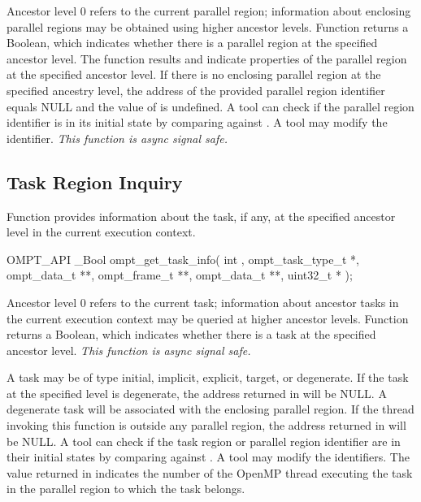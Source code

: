 \documentclass{article}
\begin{document}
\noindent 
Ancestor level 0 refers to the current parallel region; 
information about enclosing parallel regions may be obtained using higher ancestor levels. 
Function  returns a Boolean, which indicates whether there is a parallel region at the specified ancestor level.
The function results  and  indicate properties of the parallel region at the specified ancestor level.
If there is no enclosing parallel region at the specified ancestry level, the address of the provided parallel region identifier  equals NULL and the value of  is undefined.
A tool can check if the parallel region identifier is in its initial state by comparing against .
A tool may modify the identifier.
{\em This function is async signal safe.}
 
\subsection{Task Region Inquiry}
\label{sec:task-region}

Function  provides information about the task, if any, at the specified ancestor level in the current execution context.

\begin{boxedcode}
OMPT\_API \_Bool ompt\_get\_task\_info(
  int ,
  ompt\_task\_type\_t *,
  ompt\_data\_t **,
  ompt\_frame\_t **,
  ompt\_data\_t **,
  uint32\_t *
);
\end{boxedcode}
\noindent
Ancestor level 0 refers to the current task; information about ancestor tasks in the current execution context may be queried at higher ancestor levels. 
Function  returns a Boolean, which indicates whether there is a task at the specified ancestor level.
{\em This function is async signal safe.} 

A task may be of type initial, implicit, explicit,  target, or degenerate. 
If the task at the specified level is degenerate, the address returned in  will be NULL.
A degenerate task will be associated with the enclosing parallel region. 
If the thread invoking this function is outside any parallel region, the address returned in  will be NULL.
A tool can check if the task region or parallel region identifier are in their initial states by comparing against .
A tool may modify the identifiers.
The value returned in  indicates the number of the OpenMP thread executing the task in the parallel region to which the task belongs.
\end{document}
